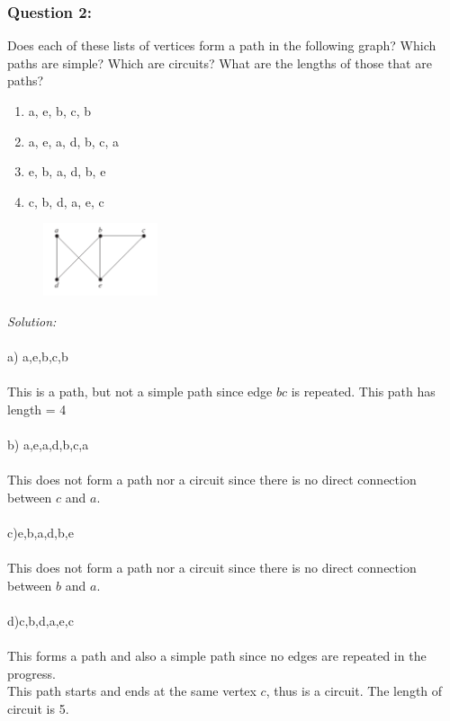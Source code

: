 \documentclass[a4paper]{article}
\begin{document}
	
	
	
	
	\subsubsection*{Question 2:}
	Does each of these lists of vertices form a path in the following graph? Which paths are simple? Which are circuits? What are the lengths of those that are paths?
	\begin{enumerate}[label=\alph*)]
		\item a, e, b, c, b
		\item a, e, a, d, b, c, a
		\item e, b, a, d, b, e
		\item c, b, d, a, e, c
	\end{enumerate}
	\begin{figure}[H]
		\centering
		\includegraphics[width=0.3\textwidth]{tut92.png}
	\end{figure}
	\textit{Solution:}\\\\
	a) a,e,b,c,b\\\\
	This is a path, but not a simple path since edge $bc$ is repeated. This path has length = 4 \\\\
	b) a,e,a,d,b,c,a\\\\
	This does not form a path nor a circuit since there is no direct connection between $c$ and $a$.\\\\
	c)e,b,a,d,b,e\\\\
	This does not form a path nor a circuit since there is no direct connection between $b$ and $a$.\\\\
	d)c,b,d,a,e,c\\\\
	This forms a path and also a simple path since no edges are repeated in the progress.\\
	This path starts and ends at the same vertex $c$, thus is a circuit. The length of circuit is 5.
\end{document}
